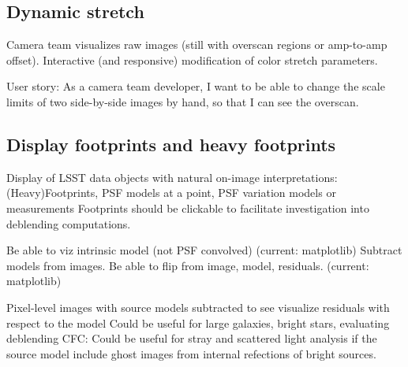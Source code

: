 \subsection{Dynamic stretch}

Camera team visualizes raw images (still with overscan regions or amp-to-amp offset).
Interactive (and responsive) modification of color stretch parameters.

User story:  As a camera team developer,  I want to be able to change the scale limits of two side-by-side images by hand, so that I can see the overscan.



\subsection{Display footprints and heavy footprints}
Display of LSST data objects with natural on-image interpretations: (Heavy)Footprints, PSF models at a point, PSF variation models or measurements
Footprints should be clickable to facilitate investigation into deblending computations.

Be able to viz intrinsic model (not PSF convolved) (current: matplotlib)
Subtract models from images. Be able to flip from image, model, residuals.   (current: matplotlib)

Pixel-level images with source models subtracted to see visualize residuals with respect to the model
Could be useful for large galaxies, bright stars, evaluating deblending
CFC: Could be useful for stray and scattered light analysis if the source model include ghost images from internal refections of bright sources.

